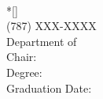 

 		

\backmatter

\biography{
			
}


\begin{simpleenv}{}{}{}{}%
\pagestyle{empty}
\begin{flushleft}
\Title\\*[\BaseDiff\baselineskip]
\FullName\\
(787) XXX-XXXX\\
Department of \Department \\
Chair: \Chair\\
Degree: \DegreeType\\
Graduation Date: \GradMonth~\GradYear
\end{flushleft}
\GoDouble

\end{simpleenv}

